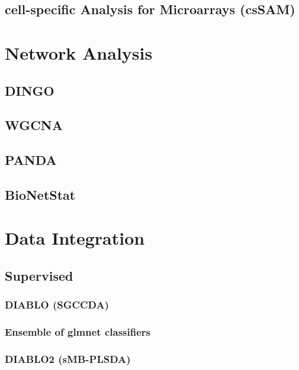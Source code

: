 \documentclass[]{book}
\begin{document}
\section{cell-specific Analysis for Microarrays
(csSAM)}\label{cell-specific-analysis-for-microarrays-cssam}

\chapter{Network Analysis}\label{network-analysis}

\section{DINGO}\label{dingo}

\section{WGCNA}\label{wgcna}

\section{PANDA}\label{panda}

\section{BioNetStat}\label{bionetstat}

\chapter{Data Integration}\label{data-integration}

\section{Supervised}\label{supervised}

\subsection{DIABLO (SGCCDA)}\label{diablo-sgccda}

\subsection{Ensemble of glmnet
classifiers}\label{ensemble-of-glmnet-classifiers}

\subsection{DIABLO2 (sMB-PLSDA)}\label{diablo2-smb-plsda}
\end{document}
